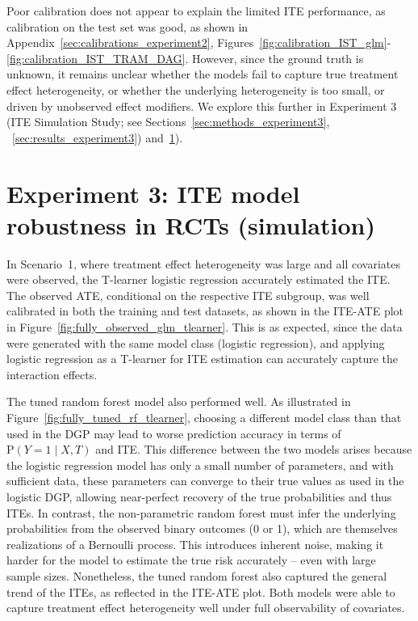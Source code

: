 \medskip

Poor calibration does not appear to explain the limited ITE performance, as calibration on the test set was good, as shown in Appendix~\ref{sec:calibrations_experiment2}, Figures~\ref{fig:calibration_IST_glm}-\ref{fig:calibration_IST_TRAM_DAG}. However, since the ground truth is unknown, it remains unclear whether the models fail to capture true treatment effect heterogeneity, or whether the underlying heterogeneity is too small, or driven by unobserved effect modifiers. We explore this further in Experiment 3 (ITE Simulation Study; see Sections~\ref{sec:methods_experiment3}, ~\ref{sec:results_experiment3}) and~\ref{sec:disc_experiment3}).


\section{Experiment 3: ITE model robustness in RCTs (simulation)} \label{sec:disc_experiment3}



In Scenario~1, where treatment effect heterogeneity was large and all covariates were observed, the T-learner logistic regression accurately estimated the ITE. The observed ATE, conditional on the respective ITE subgroup, was well calibrated in both the training and test datasets, as shown in the ITE-ATE plot in Figure~\ref{fig:fully_observed_glm_tlearner}. This is as expected, since the data were generated with the same model class (logistic regression), and applying logistic regression as a T-learner for ITE estimation can accurately capture the interaction effects.

The tuned random forest model also performed well. As illustrated in Figure~\ref{fig:fully_tuned_rf_tlearner}, choosing a different model class than that used in the DGP may lead to worse prediction accuracy in terms of $\text{P}(Y = 1 \mid X, T)$ and ITE. This difference between the two models arises because the logistic regression model has only a small number of parameters, and with sufficient data, these parameters can converge to their true values as used in the logistic DGP, allowing near-perfect recovery of the true probabilities and thus ITEs. In contrast, the non-parametric random forest must infer the underlying probabilities from the observed binary outcomes (0 or 1), which are themselves realizations of a Bernoulli process. This introduces inherent noise, making it harder for the model to estimate the true risk accurately -- even with large sample sizes. Nonetheless, the tuned random forest also captured the general trend of the ITEs, as reflected in the ITE-ATE plot. Both models were able to capture treatment effect heterogeneity well under full observability of covariates.

